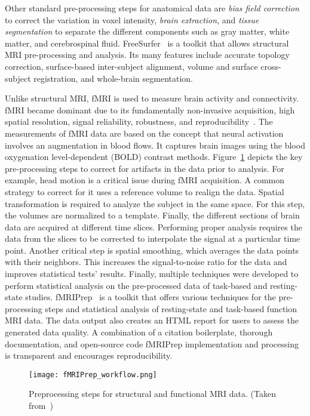 Other standard pre-processing steps for anatomical data are \textit{bias field correction}
to correct the variation in voxel intensity, \textit{brain extraction}, and \textit{tissue segmentation}
to separate the different components such as gray matter, white matter, and cerebrospinal fluid.
FreeSurfer~\cite{Fischl2012-bp} is a toolkit that allows structural MRI pre-processing and analysis.
Its many features include accurate topology correction, surface-based inter-subject
alignment, volume and surface cross-subject registration, and whole-brain segmentation.

Unlike structural MRI, fMRI is used to measure brain activity and connectivity.
fMRI became dominant due to its fundamentally non-invasive acquisition, high spatial
resolution, signal reliability, robustness, and reproducibility~\cite{Soares2016-tz}.
The measurements of fMRI data are based on the concept that neural activation involves
an augmentation in blood flows.
It captures brain images using the blood oxygenation level-dependent (BOLD) contrast methods.
Figure~\ref{fig:fmri_workflow} depicts the key pre-processing steps to correct
for artifacts in the data prior to analysis.
For example, head motion is a critical issue during fMRI acquisition.
A common strategy to correct for it uses a reference volume to realign the data.
Spatial transformation is required to analyze the subject in the same space.
For this step, the volumes are normalized to a template.
Finally, the different sections of brain data are acquired at different time slices.
Performing proper analysis requires the data from the slices to be corrected to interpolate the signal at a particular time point.
Another critical step is spatial smoothing, which averages the data points with their neighbors.
This increases the signal-to-noise ratio for the data and improves statistical tests' results.
Finally, multiple techniques were developed to perform statistical analysis on the pre-processed data of task-based and resting-state studies.
fMRIPrep~\cite{Esteban2019-og} is a toolkit that offers various techniques for the pre-processing steps
and statistical analysis of resting-state and task-based function MRI data.
The data output also creates an HTML report for users to assess the generated data quality.
A combination of a citation boilerplate, thorough documentation, and open-source code
fMRIPrep implementation and processing is transparent and encourages reproducibility. 

\begin{figure}[h]
	\centering
	\texttt{[image: fMRIPrep\_workflow.png]}
	\caption{Preprocessing steps for structural and functional MRI data. (Taken from~\cite{Esteban2019-og})}
	\label{fig:fmri_workflow}
\end{figure}

